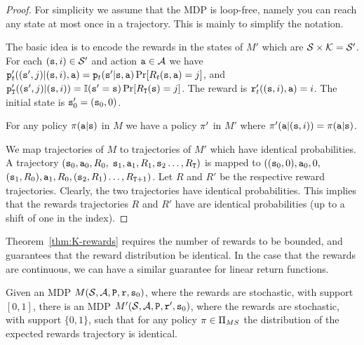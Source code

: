 \begin{proof}
For simplicity we assume that the MDP is loop-free, namely you can reach any state at most once in a trajectory. This is mainly to simplify the notation.

The basic idea is to encode the rewards in the states of $M'$ which
are
$\mathcal{S}\times {\cal K}=\mathcal{S}'$.
%
For each $({\tt s},i)\in \mathcal{S}'$ and action ${\tt a}\in\mathcal{A}$ we
have
${\tt p}'_t(({\tt s}',j)|({\tt s},i),{\tt a})={\tt p}_t({\tt s}'|{\tt s},{\tt a})\Pr[R_t({\tt s},{\tt a})=j]$,
and
${\tt p}'_{{\tt T}}(({\tt s}',j)|({\tt s},i))=\mathbb{I}({\tt s}'={\tt s})\Pr[R_{{\tt T}}({\tt s})=j]$.
The reward is ${\tt r}'_t(({\tt s},i),{\tt a})=i$. The initial state
is ${\tt s}'_0=({\tt s}_0,0)$.

For any policy $\pi({\tt a}|{\tt s})$ in $M$ we have a policy
$\pi'$ in $M'$ where
$\pi'({\tt a}|({\tt s},i))=\pi({\tt a}|{\tt s})$.

We map trajectories of $M$ to trajectories of $M'$ which have
identical probabilities. A trajectory $({\tt s}_0, {\tt a}_0 , R_0 ,$
${\tt s}_1,{\tt a}_1,R_1, {\tt s}_2 \ldots, R_{{\tt T}})$ is mapped to
$(({\tt s}_0,0), {\tt a}_0 , 0 ,$ $ ({\tt s}_1,R_0),{\tt a}_1,R_0,
({\tt s}_2,R_1) \ldots, R_{{\tt T}+1})$. Let $R$ and $R'$ be the
respective reward trajectories.
%
Clearly, the two trajectories have identical probabilities. This
implies that the rewards trajectories $R$ and $R'$ have are
identical probabilities (up to a shift of one in the index).
\end{proof}

Theorem~\ref{thm:K-rewards} requires the number of rewards to be
bounded, and guarantees that the reward distribution be identical.
In the case that the rewards are continuous, we can have a similar
guarantee for linear return functions.


\begin{theorem}
Given an MDP $M(\mathcal{S},\mathcal{A},{\tt P},{\tt r},{\tt s}_0)$, where the
rewards are stochastic, with support $[0,1]$, there is an MDP
$M'(\mathcal{S},\mathcal{A},{\tt P},{\tt r}',{\tt s}_0)$, where the rewards are
stochastic, with support $\{0,1\}$,
such that for any policy $\pi\in \Pi_{MS}$ the distribution of
the expected rewards trajectory is identical.
\end{theorem}

